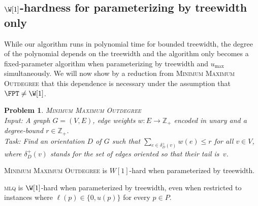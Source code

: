 \documentclass{llncs}
\newtheorem{pr}[theorem]{Problem}
\begin{document}
\subsection{$\W[1]$-hardness for parameterizing by treewidth only}

While our algorithm runs in polynomial time for bounded treewidth, the degree of the polynomial depends on the treewidth and the algorithm only becomes a fixed-parameter algorithm when parameterizing by treewidth and $u_{\max}$ simultaneously. We will now show by a reduction from \textsc{Minimum Maximum Outdegree} that this dependence is necessary under the assumption that $\FPT \neq \W[1]$. 

\begin{pr}\textsc{Minimum Maximum Outdegree}\ \\
	Input: A graph $G = (V, E)$, edge weights $w: E \rightarrow \mathbb{Z}_+$ encoded in unary and a degree-bound $r \in \mathbb{Z}_+$.\\
Task: Find an orientation $D$ of $G$ such that $\sum_{e \in \delta_D^+(v)} w(e) \leq r$ for all $v \in V$, where $\delta_D^+(v)$ stands for the set of edges oriented so that their tail is~$v$.
\end{pr}

\begin{theorem}
  \textsc{Minimum Maximum Outdegree} is $W[1]$-hard when parameterized by treewidth.
\end{theorem}

\newcommand{\edgestartpost}[2]{p_{#1,#2}\xspace}
\newcommand{\edgeendpost}[2]{p_{#1,#2}\xspace}
\newcommand{\nodepost}[1]{p_{#1}\xspace}
\newcommand{\edgestartapp}[3]{a^{#3}_{#1,#2}\xspace}
\newcommand{\edgeendapp}[3]{a^{#3}_{#1,#2}\xspace}
\newcommand{\edgeapp}[1]{z_{#1}\xspace}

\begin{theorem}
  \textsc{mlq} is $\W[1]$-hard when parameterized by treewidth, even when restricted to instances where $\ell(p) \in \{0, u(p)\}$ for every $p \in P$.
\end{theorem}
\end{document}
